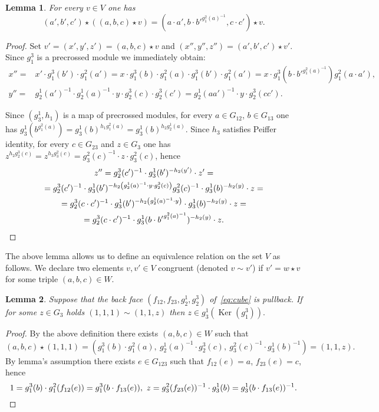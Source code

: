 \documentclass[oneside, 10pt]{amsart}
\DeclareMathOperator{\Ker}{Ker}
\numberwithin{equation}{section}
\newtheorem{lemma}{Lemma}
\numberwithin{lemma}{section}
\theoremstyle{definition}
\theoremstyle{remark}
\begin{document}
\begin{lemma} For every $v \in V$ one has 
 \begin{equation*}(a', b', c') \star \left( (a, b, c) \star v \right) = (a \cdot a', b \cdot {b'}^{g_1^2(a)^{-1}}, c \cdot c') \star v.\end{equation*}
\end{lemma}
\begin{proof}
Set $v'=(x', y', z') = (a, b, c) \star v$ and $(x'', y'', z'') = (a', b', c') \star v'$.
Since $g_1^3$ is a precrossed module we immediately obtain:
\begin{align*} 
 x'' =& x' \cdot g_1^3(b') \cdot g_1^2(a') = x \cdot g_1^3(b) \cdot g_1^2(a) \cdot g_1^3(b') \cdot g_1^2(a') = x \cdot g_1^3(b \cdot b'^{g_1^2(a)^{-1}}) g_1^2(a \cdot a'),\\
 y'' =& g_2^1(a')^{-1} \cdot g_2^1(a)^{-1} \cdot y \cdot g_2^3(c) \cdot g_2^3(c') = g_2^1(aa')^{-1} \cdot y \cdot g_2^3(cc'). \end{align*}

Since $(g_3^1, h_1)$ is a map of precrossed modules, for every $a \in G_{12}$, $b \in G_{13}$ one has $g_3^1(b^{g_1^2(a)}) = g_3^1(b)^{h_1 g_1^2(a)} = g_3^1(b)^{h_2g_2^1(a)}$.
Since $h_3$ satisfies Peiffer identity, for every $c \in G_{23}$ and $z \in G_3$ one has $z ^{h_2 g_2^3(c)} = z^{ h_3 g_3^2(c)} = g_3^2(c)^{-1} \cdot z \cdot g_3^2(c)$, hence
\begin{multline*}
  z'' = g_2^3(c')^{-1} \cdot g_3^1(b')^{-h_2(y')} \cdot z' = \\ 
  = g_2^3(c')^{-1} \cdot g_3^1(b')^{- h_2 \left( g_2^1(a)^{-1} \cdot y \cdot g_2^3(c) \right)} g_3^2(c)^{-1} \cdot g_3^1(b)^{-h_2(y)} \cdot z = \\
  = g_2^3(c \cdot c')^{-1} \cdot g_3^1(b')^{- h_2 \left( g_2^1(a)^{-1} \cdot y \right)} \cdot g_3^1(b)^{-h_2(y)} \cdot z = \\
  = g_2^3(c \cdot c')^{-1} \cdot g_3^1(b \cdot {b'} ^ {g_1^2(a)^{-1}})^{- h_2 \left( y \right)} \cdot z. \qedhere
\end{multline*}
\end{proof}

The above lemma allows us to define an equivalence relation on the set $V$ as follows.
We declare two elements $v, v' \in V$ congruent (denoted $v \sim v'$) if $v' = w \star v$ for some triple $(a, b, c) \in W$.
 
\begin{lemma} Suppose that the back face $(f_{12}, f_{23}, g_2^1, g_2^3)$ of~\eqref{eq:cube} is pullback.
If for some $z\in G_3$ holds $(1, 1, 1)\sim (1, 1, z)$ then $z \in g_3^1(\Ker(g_1^3)).$ \end{lemma}
\begin{proof} By the above definition there exists $(a, b, c)\in W$ such that
 \[ (a, b, c) \star (1, 1, 1) = ( g_1^3(b) \cdot g_1^2(a),\ g_2^1(a)^{-1} \cdot g_2^3(c),\ g_3^2(c)^{-1} \cdot g_3^1(b)^{-1}) = (1,1,z). \]
 By lemma's assumption there exists $e \in G_{123}$ such that $f_{12}(e) = a$, $f_{23}(e) = c$, hence
 \[ 1 = g_1^3(b) \cdot g_1^2(f_{12}(e)) = g_1^3(b \cdot f_{13}(e)),\ z = g_3^2(f_{23}(e))^{-1} \cdot g_3^1(b) = g_3^1(b \cdot f_{13}(e))^{-1}. \qedhere\] \end{proof}
\end{document}
